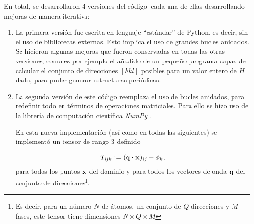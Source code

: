 \documentclass{article}
\begin{document}
En total, se desarrollaron 4 versiones del código, cada una de ellas desarrollando mejoras de manera iterativa: 

\begin{enumerate}
    \item La primera versión fue escrita en lenguaje ``estándar'' de Python, es decir, sin el uso de bibliotecas externas. Esto implica el uso de grandes bucles anidados. Se hicieron algunas mejoras que fueron conservadas en todas las otras versiones, como es por ejemplo el añadido de un pequeño programa capaz de calcular el conjunto de direcciones $[hkl]$ posibles para un valor entero de $H$ dado, para poder generar estructuras periódicas. 
    \item La segunda versión de este código reemplaza el uso de bucles anidados, para redefinir todo en términos de operaciones matriciales. Para ello se hizo uso de la librería de computación científica \textit{NumPy} \cite{Harris2020}. 
    
    En esta nueva implementación (así como en todas las siguientes) se implementó un tensor de rango 3 definido 
    
    \begin{equation}
        T_{ijk} := (\vb{q\vdot x})_{ij} + \phi_k,
    \end{equation}
    para todos los puntos $\vb{x}$ del dominio y para todos los vectores de onda $\vb{q}$ del conjunto de direcciones\footnote{Es decir, para un número $N$ de átomos, un conjunto de $Q$ direcciones y $M$ fases, este tensor tiene dimensiones $N\times Q\times M$}.
    

\end{enumerate}
\end{document}
